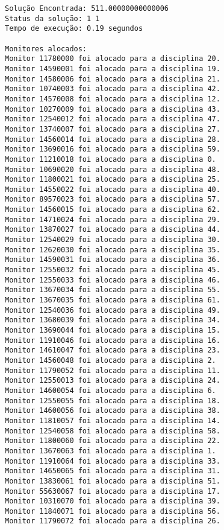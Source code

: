 \documentclass[a4paper,12pt]{article}
\begin{document}
\begin{lstlisting}[breaklines=true]
Solução Encontrada: 511.00000000000006
Status da solução: 1 1
Tempo de execução: 0.19 segundos

Monitores alocados:
Monitor 11780000 foi alocado para a disciplina 20.
Monitor 14590001 foi alocado para a disciplina 19.
Monitor 14580006 foi alocado para a disciplina 21.
Monitor 10740003 foi alocado para a disciplina 42.
Monitor 14570008 foi alocado para a disciplina 12.
Monitor 10270009 foi alocado para a disciplina 43.
Monitor 12540012 foi alocado para a disciplina 47.
Monitor 13740007 foi alocado para a disciplina 27.
Monitor 14560014 foi alocado para a disciplina 28.
Monitor 13690016 foi alocado para a disciplina 59.
Monitor 11210018 foi alocado para a disciplina 0.
Monitor 10690020 foi alocado para a disciplina 48.
Monitor 11800021 foi alocado para a disciplina 25.
Monitor 14550022 foi alocado para a disciplina 40.
Monitor 89570023 foi alocado para a disciplina 57.
Monitor 14560015 foi alocado para a disciplina 62.
Monitor 14710024 foi alocado para a disciplina 29.
Monitor 13870027 foi alocado para a disciplina 44.
Monitor 12540029 foi alocado para a disciplina 30.
Monitor 12620030 foi alocado para a disciplina 35.
Monitor 14590031 foi alocado para a disciplina 36.
Monitor 12550032 foi alocado para a disciplina 45.
Monitor 12550033 foi alocado para a disciplina 46.
Monitor 13670034 foi alocado para a disciplina 55.
Monitor 13670035 foi alocado para a disciplina 61.
Monitor 12540036 foi alocado para a disciplina 49.
Monitor 13680039 foi alocado para a disciplina 34.
Monitor 13690044 foi alocado para a disciplina 15.
Monitor 11910046 foi alocado para a disciplina 16.
Monitor 14610047 foi alocado para a disciplina 23.
Monitor 14560048 foi alocado para a disciplina 2.
Monitor 11790052 foi alocado para a disciplina 11.
Monitor 12550013 foi alocado para a disciplina 24.
Monitor 14600054 foi alocado para a disciplina 6.
Monitor 12550055 foi alocado para a disciplina 18.
Monitor 14600056 foi alocado para a disciplina 38.
Monitor 11810057 foi alocado para a disciplina 14.
Monitor 12540058 foi alocado para a disciplina 58.
Monitor 11800060 foi alocado para a disciplina 22.
Monitor 13670063 foi alocado para a disciplina 1.
Monitor 11910064 foi alocado para a disciplina 33.
Monitor 14650065 foi alocado para a disciplina 31.
Monitor 13830061 foi alocado para a disciplina 51.
Monitor 55630067 foi alocado para a disciplina 17.
Monitor 10310070 foi alocado para a disciplina 39.
Monitor 11840071 foi alocado para a disciplina 56.
Monitor 11790072 foi alocado para a disciplina 26.

\end{lstlisting}
\end{document}
